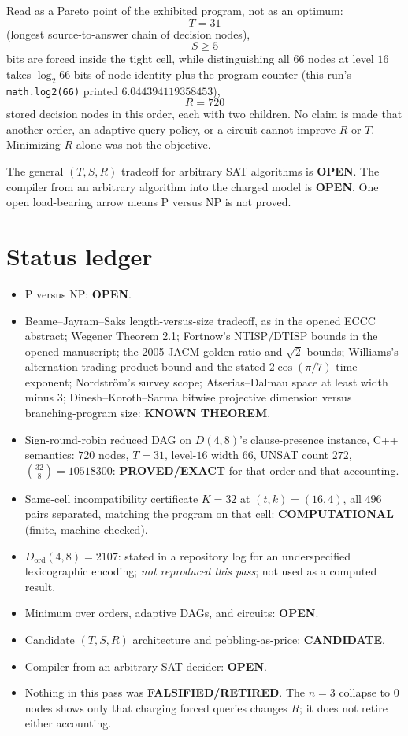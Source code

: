 \documentclass[11pt]{article}
\begin{document}
Read as a Pareto point of the exhibited program, not as an optimum:
\[
T=31
\]
(longest source-to-answer chain of decision nodes),
\[
S\ge 5
\]
bits are forced inside the tight cell, while distinguishing all \(66\) nodes at level \(16\) takes \(\log_2 66\) bits of node identity plus the program counter (this run's \texttt{math.log2(66)} printed \(6.044394119358453\)),
\[
R=720
\]
stored decision nodes in this order, each with two children.
No claim is made that another order, an adaptive query policy, or a circuit cannot improve \(R\) or \(T\).
Minimizing \(R\) alone was not the objective.

The general \((T,S,R)\) tradeoff for arbitrary SAT algorithms is \textbf{OPEN}.
The compiler from an arbitrary algorithm into the charged model is \textbf{OPEN}.
One open load-bearing arrow means P versus NP is not proved.

\section{Status ledger}
\begin{itemize}
\item P versus NP: \textbf{OPEN}.
\item Beame--Jayram--Saks length-versus-size tradeoff, as in the opened ECCC abstract; Wegener Theorem 2.1; Fortnow's \(\mathrm{NTISP}/\mathrm{DTISP}\) bounds in the opened manuscript; the 2005 JACM golden-ratio and \(\sqrt{2}\) bounds; Williams's alternation-trading product bound and the stated \(2\cos(\pi/7)\) time exponent; Nordstr\"om's survey scope; Atserias--Dalmau space at least width minus 3; Dinesh--Koroth--Sarma bitwise projective dimension versus branching-program size: \textbf{KNOWN THEOREM}.
\item Sign-round-robin reduced DAG on \(D(4,8)\)'s clause-presence instance, C++ semantics: \(720\) nodes, \(T=31\), level-\(16\) width \(66\), UNSAT count \(272\), \(\binom{32}{8}=10518300\): \textbf{PROVED/EXACT} for that order and that accounting.
\item Same-cell incompatibility certificate \(K=32\) at \((t,k)=(16,4)\), all \(496\) pairs separated, matching the program on that cell: \textbf{COMPUTATIONAL} (finite, machine-checked).
\item \(D_{\mathrm{ord}}(4,8)=2107\): stated in a repository log for an underspecified lexicographic encoding; \emph{not reproduced this pass}; not used as a computed result.
\item Minimum over orders, adaptive DAGs, and circuits: \textbf{OPEN}.
\item Candidate \((T,S,R)\) architecture and pebbling-as-price: \textbf{CANDIDATE}.
\item Compiler from an arbitrary SAT decider: \textbf{OPEN}.
\item Nothing in this pass was \textbf{FALSIFIED/RETIRED}. The \(n=3\) collapse to \(0\) nodes shows only that charging forced queries changes \(R\); it does not retire either accounting.
\end{itemize}
\end{document}
